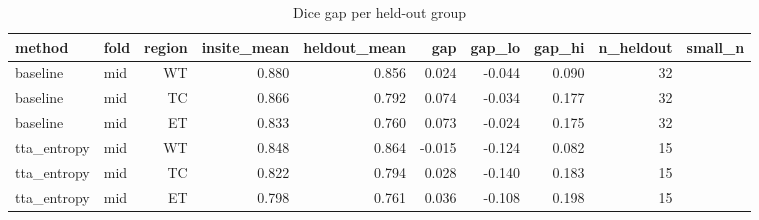 \begin{table}[t]
\centering
\caption{Dice gap per held-out group}
\label{tab:gap}
\begin{tabular}{llrrrrrrrr}
\hline
method & fold & region & insite\_mean & heldout\_mean & gap & gap\_lo & gap\_hi & n\_heldout & small\_n \\
\hline
baseline & mid & WT & 0.880 & 0.856 & 0.024 & -0.044 & 0.090 & 32 &  \\
baseline & mid & TC & 0.866 & 0.792 & 0.074 & -0.034 & 0.177 & 32 &  \\
baseline & mid & ET & 0.833 & 0.760 & 0.073 & -0.024 & 0.175 & 32 &  \\
tta\_entropy & mid & WT & 0.848 & 0.864 & -0.015 & -0.124 & 0.082 & 15 &  \\
tta\_entropy & mid & TC & 0.822 & 0.794 & 0.028 & -0.140 & 0.183 & 15 &  \\
tta\_entropy & mid & ET & 0.798 & 0.761 & 0.036 & -0.108 & 0.198 & 15 &  \\
\hline
\end{tabular}
\end{table}
